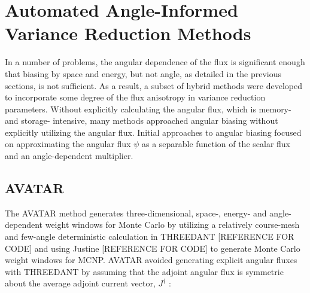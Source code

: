 \section{Automated Angle-Informed Variance Reduction Methods}
\label{sec:AngleVR}

In a number of problems, the angular dependence of the flux is significant enough that
biasing by space and energy, but not angle, as detailed in the previous
sections, is not
sufficient. As a result, a subset of hybrid methods were developed to incorporate some
degree of the flux anisotropy in variance reduction parameters. Without explicitly
calculating the angular flux, which is memory- and storage- intensive, many methods
approached angular biasing without explicitly utilizing the angular flux.
Initial approaches
to angular biasing focused on approximating the angular flux $\psi$ as a separable
function of the scalar flux and an angle-dependent multiplier.

\subsection{AVATAR}

The AVATAR \cite{van_riper_generation_1995, van_riper_avatarautomatic_1997}
method generates
three-dimensional, space-, energy- and angle-dependent weight windows for Monte
Carlo by
utilizing a relatively course-mesh and few-angle deterministic calculation in
THREEDANT
[REFERENCE FOR CODE] and using Justine [REFERENCE FOR CODE] to generate Monte
Carlo weight
windows for MCNP. AVATAR avoided generating explicit angular fluxes with
THREEDANT by assuming
that the adjoint angular flux is symmetric about the average adjoint current vector,
$J^{\dagger}$ :

